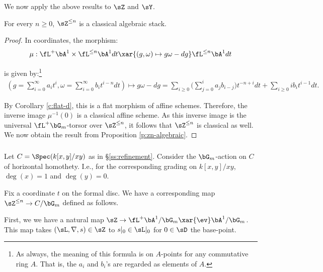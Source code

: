 We now apply the above results to $\sZ$ and $\sY$.

\begin{prop}
\notready\label{p:zn-cl}

For every $n \geq 0$, $\sZ^{\leq n}$ is a
classical algebraic stack.

\end{prop}

\begin{proof}

In coordinates, the morphism:
%
\[
\mu:\fL^+ \bA^1 \times \fL^{\leq n} \bA^1 dt
\xar{(g,\omega) \mapsto g\omega - dg}
\fL^{\leq n} \bA^1 dt
\]

 is given by:\footnote{As always, the meaning of this
formula is on $A$-points for any commutative ring $A$. That is,
the $a_i$ and $b_i$'s are regarded as elements of $A$.}
%
\[
\begin{gathered}
(g = \sum_{i=0}^{\infty} a_i t^i,
\omega = \sum_{i = 0}^{\infty} b_i t^{i-n} dt) \mapsto
g \omega - dg =
\sum_{i \geq 0}
\big(\sum_{j = 0}^i a_j b_{i-j}\big) t^{-n+i} dt
+ \sum_{i \geq 0} i b_i t^{i-1} dt.
\end{gathered}
\]

By Corollary \ref{c:flat-d}, this is a flat morphism of affine schemes.
Therefore, the inverse image $\mu^{-1}(0)$ is a classical affine scheme.
As this inverse image is the universal $\fL^+ \bG_m$-torsor
over $\sZ^{\leq n}$, it follows that $\sZ^{\leq n}$ is classical as well.
We now obtain the result from Proposition \ref{p:zn-algebraic}.

\end{proof}

\subsubsection{}\label{ss:z-refinement}

Let $C = \Spec(k[x,y]/xy)$ as in \S \ref{ss:refinement}.
Consider the $\bG_m$-action on $C$ of horizontal
homothety. I.e., for the corresponding grading on
$k[x,y]/xy$, $\deg(x) = 1$ and $\deg(y) = 0$.

Fix a coordinate $t$ on the formal disc.
We have a corresponding
map $\sZ^{\leq n} \to C/\bG_m$ defined as follows.

First, we we have a natural map
$\sZ \to \fL^+\bA^1/\bG_m \xar{\ev} \bA^1/\bG_m$.
This map takes $(\sL,\nabla,s) \in \sZ$ to $s|_0 \in \sL|_0$
for $0 \in \sD$ the base-point.

